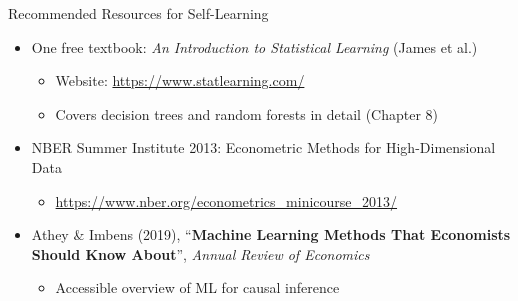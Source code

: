 \documentclass[hyperref={pdfpagelabels=false}]{beamer}
\begin{document}
\begin{frame}{Recommended Resources for Self-Learning}
	\begin{itemize}
		\item One free textbook: \textit{An Introduction to Statistical Learning} (James et al.)
		\vspace{0.2cm}
		\begin{itemize}
			\item Website: \url{https://www.statlearning.com/}
			\vspace{0.2cm}
			\item Covers decision trees and random forests in detail (Chapter 8)
		\end{itemize}
		\vspace{0.3cm}
		\item NBER Summer Institute 2013: Econometric Methods for High-Dimensional Data
		\vspace{0.2cm}
		\begin{itemize}
			\item \url{https://www.nber.org/econometrics_minicourse_2013/}
		\end{itemize}
		\vspace{0.3cm}
		\item Athey \& Imbens (2019), ``\textbf{Machine Learning Methods That Economists Should Know About}'', \textit{Annual Review of Economics}
		\vspace{0.2cm}
		\begin{itemize}
			\item Accessible overview of ML for causal inference
		\end{itemize}
	\end{itemize}
\end{frame}
\end{document}
